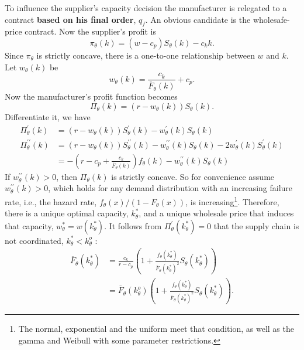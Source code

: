 To influence the supplier's capacity decision the manufacturer is relegated to a contract \textbf{based on his final order}, $q_f$. An obvious candidate is the wholesafe-price contract. Now the supplier's profit is
\begin{equation*}
    \pi_\theta(k)=(w-c_p)S_\theta(k)-c_k k.
\end{equation*}
Since $\pi_\theta$ is strictly concave, there is a one-to-one relationship between $w$ and $k$. 
Let $w_\theta(k)$ be 
\begin{equation*}
    w_\theta(k)=\frac{c_k}{\overline{F}_\theta(k)}+c_p.
\end{equation*}
Now the manufacturer's profit function becomes
\begin{equation*}
    \Pi_\theta(k)=(r-w_\theta(k))S_\theta(k).
\end{equation*}
Differentiate it, we have 
$$
\begin{aligned}
\Pi_{\theta}^{\prime}(k) &=\left(r-w_{\theta}(k)\right) S_{\theta}^{\prime}(k)-w_{\theta}^{\prime}(k) S_{\theta}(k) \\
\Pi_{\theta}^{\prime \prime}(k) &=\left(r-w_{\theta}(k)\right) S_{\theta}^{\prime \prime}(k)-w_{\theta}^{\prime \prime}(k) S_{\theta}(k)-2 w_{\theta}^{\prime}(k) S_{\theta}^{\prime}(k) \\
&=-\left(r-c_{p}+\frac{c_{k}}{\overline{F}_{\theta}(k)}\right) f_{\theta}(k)-w_{\theta}^{\prime \prime}(k) S_{\theta}(k)
\end{aligned}
$$
If $w_{\theta}^{\prime \prime}(k)>0$, then $\Pi_{\theta}(k)$ is strictly concave. So for convenience assume $w_{\theta}^{\prime \prime}(k)>0$, which holds for any demand distribution with an increasing failure rate, i.e., the hazard rate, $f_{\theta}(x) /\left(1-F_{\theta}(x)\right)$, is increasing\footnote{The normal, exponential and the uniform meet that condition, as well as the gamma and Weibull with some parameter restrictions.}. Therefore, there is a unique optimal capacity, $k_{\theta}^{*}$, and a unique wholesale price that induces that capacity, $w_{\theta}^{*}=w\left(k_{\theta}^{*}\right)$. It follows from $\Pi_{\theta}^{\prime}\left(k_{\theta}^{*}\right)=0$ that the supply chain is not coordinated, $k_{\theta}^{*}<k_{\theta}^{o}$ :
$$
\begin{aligned} 
\overline{F}_{\theta}\left(k_{\theta}^{*}\right) &=\frac{c_{k}}{r-c_{p}}\left(1+\frac{f_{\theta}\left(k_{\theta}^{*}\right)}{\overline{F}_{\theta}\left(k_{\theta}^{*}\right)^{2}} S_{\theta}\left(k_{\theta}^{*}\right)\right) \\
&=\overline{F}_{\theta}\left(k_{\theta}^{o}\right)\left(1+\frac{f_{\theta}\left(k_{\theta}^{*}\right)}{\overline{F}_{\theta}\left(k_{\theta}^{*}\right)^{2}} S_{\theta}\left(k_{\theta}^{*}\right)\right) .
\end{aligned}
$$

